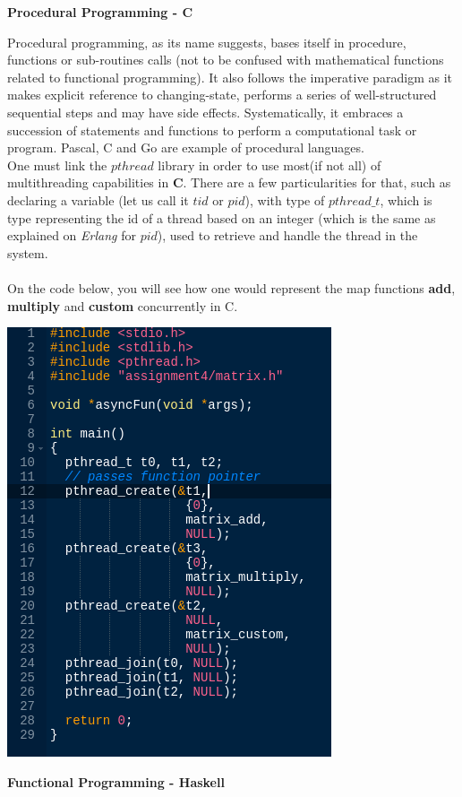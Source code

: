 \documentclass[conference]{IEEEtran}
\begin{document}
\textbf{ Procedural Programming - C }

Procedural programming, as its name suggests, bases itself in procedure, functions or sub-routines calls (not to be confused with mathematical functions related to functional programming). It also follows the imperative paradigm as it makes explicit reference to changing-state, performs a series of well-structured sequential steps and may have side effects. Systematically, it embraces a succession of statements and functions to perform a computational task or program. Pascal, C and Go are example of procedural languages.
\\One must link the $pthread$ library in order to use most(if not all) of multithreading capabilities in \textbf{C}. There are a few particularities for that, such as declaring a variable (let us call it $tid$ or $pid$), with type of $pthread\_t$, which is type representing the id of a thread based on an integer (which is the same as explained on \textit{Erlang} for $pid$), used to retrieve and handle the thread in the system.
\\\\
On the code below, you will see how one would represent the map functions \textbf{add}, \textbf{multiply} and \textbf{custom} concurrently in C.

\includegraphics[scale=0.62]{c_code_5}

\textbf{ Functional Programming - Haskell }
\end{document}
